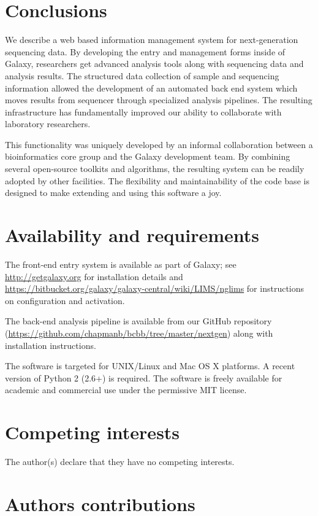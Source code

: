 \documentclass[10pt]{bmc_article}
\newenvironment{bmcformat}{\begin{raggedright}\baselineskip20pt\sloppy\setboolean{publ}{false}}{\end{raggedright}\baselineskip20pt\sloppy}
\begin{document}
\begin{bmcformat}
\section*{Conclusions}

We describe a web based information management system for
next-generation sequencing data. By developing the entry and
management forms inside of Galaxy, researchers get advanced analysis
tools along with sequencing data and analysis results. The structured
data collection of sample and sequencing information allowed the
development of an automated back end system which moves results from
sequencer through specialized analysis pipelines. The resulting
infrastructure has fundamentally improved our ability to collaborate
with laboratory researchers.

This functionality was uniquely developed by an informal collaboration
between a bioinformatics core group and the Galaxy development
team. By combining several open-source toolkits and algorithms, the
resulting system can be readily adopted by other facilities. The
flexibility and maintainability of the code base is designed to make
extending and using this software a joy.

\section*{Availability and requirements}

The front-end entry system is available as part of Galaxy; see
\url{http://getgalaxy.org} for installation details and
\url{https://bitbucket.org/galaxy/galaxy-central/wiki/LIMS/nglims} for
instructions on configuration and activation.

The back-end analysis pipeline is available from our GitHub repository
(\url{https://github.com/chapmanb/bcbb/tree/master/nextgen}) along
with installation instructions.

The software is targeted for UNIX/Linux and Mac OS X platforms. A
recent version of Python 2 (2.6+) is required. The software is
freely available for academic and commercial use under the
permissive MIT license.

\section*{Competing interests}

The author(s) declare that they have no competing interests.

\section*{Authors contributions}


\end{bmcformat}
\end{document}
